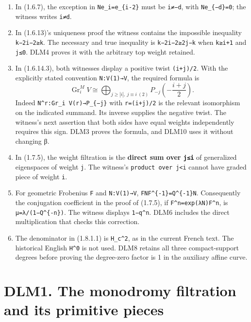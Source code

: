 \documentclass[
]{report}
\providecommand{\tightlist}{%
  \setlength{\itemsep}{0pt}\setlength{\parskip}{0pt}}
\begin{document}
\begin{enumerate}
\def\labelenumi{\arabic{enumi}.}
\tightlist
\item
  In (1.6.7), the exception in \texttt{Ne\_i=e\_\{i-2\}} must be
  \texttt{i≠−d}, with \texttt{Ne\_\{−d\}=0}; the witness writes
  \texttt{i≠d}.
\item
  In (1.6.13)'s uniqueness proof the witness contains the impossible
  inequality \texttt{k−2i−2≥k}. The necessary and true inequality is
  \texttt{k−2i−2≥2j−k} when \texttt{k≥i+1} and \texttt{j≤0}. DLM4 proves
  it with the arbitrary top weight retained.
\item
  In (1.6.14.3), both witnesses display a positive twist
  \texttt{(i+j)/2}. With the explicitly stated convention
  \texttt{N:V(1)→V}, the required formula is \[
  \operatorname{Gr}_i^M V\cong
  \bigoplus_{j\ge |i|,\ j\equiv i\ (2)}P_{-j}\left(-\frac{i+j}{2}\right).
  \tag{DLM-C1}
  \] Indeed \texttt{N\^{}r:Gr\_i\ V(r)→P\_\{−j\}} with
  \texttt{r=(i+j)/2} is the relevant isomorphism on the indicated
  summand. Its inverse supplies the negative twist. The witness's next
  assertion that both sides have equal weights independently requires
  this sign. DLM3 proves the formula, and DLM10 uses it without changing
  β.
\item
  In (1.7.5), the weight filtration is the \textbf{direct sum over
  \texttt{j≤i}} of generalized eigenspaces of weight \texttt{j}. The
  witness's \texttt{product\ over\ j\textless{}i} cannot have graded
  piece of weight \texttt{i}.
\item
  For geometric Frobenius \texttt{F} and \texttt{N:V(1)→V},
  \texttt{FNF\^{}\{-1\}=Q\^{}\{-1\}N}. Consequently the conjugation
  coefficient in the proof of (1.7.5), if
  \texttt{F\textquotesingle{}\textquotesingle{}\^{}n=exp(λN)F\textquotesingle{}\^{}n},
  is \texttt{μ=λ/(1−Q\^{}\{-n\})}. The witness displays
  \texttt{1−q\^{}n}. DLM6 includes the direct multiplication that checks
  this correction.
\item
  The denominator in (1.8.1.1) is \texttt{H\_c\^{}2}, as in the current
  French text. The historical English \texttt{H\^{}0} is not used. DLM8
  retains all three compact-support degrees before proving the
  degree-zero factor is 1 in the auxiliary affine curve.
\end{enumerate}

\section{DLM1. The monodromy filtration and its primitive
pieces}\label{dlm1.-the-monodromy-filtration-and-its-primitive-pieces}
\end{document}
